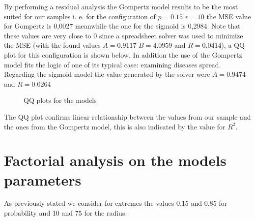 By performing a residual analysis the Gompertz model results to be the most suited for our samples i. e. for the configuration of $p=0.15$  $r=10$ the MSE value for Gompertz is 0,0027 meanwhile the one for the sigmoid is 0,2984. Note that these values are very close to 0 since a spreadsheet solver was used to minimize the MSE (with the found values $A=0.9117$ $B=4.0959$ and $R=0.0414$), a QQ plot for this configuration is shown below. In addition the use of the Gompertz model fits the logic of one of its typical case: examining diseases spread. Regarding the sigmoid model the value generated by the solver were $A=0.9474$ and $R=0.0264$


\begin{figure}[H]
    \centering
    \qquad
    \caption{QQ plots for the models}
\end{figure}




The QQ plot confirms linear relationship between the values from our sample and the ones from the Gompertz model, this is also indicated by the value for $R^2$.

\section{Factorial analysis on the models parameters}
As previously stated we consider for extremes the values 0.15 and 0.85 for probability and 10 and 75 for the radius.


